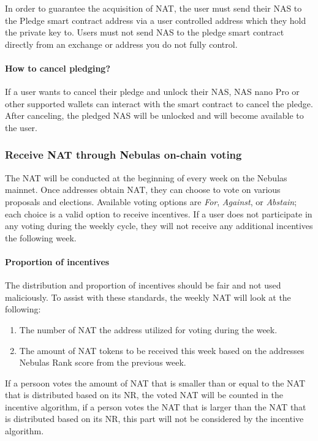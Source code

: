 In order to guarantee the acquisition of NAT, the user must send their NAS to the Pledge smart contract address via a user controlled address which they hold the private key to. Users must not send NAS to the pledge smart contract directly from an exchange or address you do not fully control.


\paragraph{How to cancel pledging?}

If a user wants to cancel their pledge and unlock their NAS, NAS nano Pro or other supported wallets can interact with the smart contract to cancel the pledge. After canceling, the pledged NAS will be unlocked and will become available to the user.

\subsubsection{Receive NAT through Nebulas on-chain voting}

The NAT will be conducted at the beginning of every week on the Nebulas
mainnet. Once addresses obtain NAT, they can choose to vote on various
proposals and elections. Available voting options are \textit{For}, \textit{Against}, or
\textit{Abstain}; each choice is a valid option to receive incentives. If a user does not participate in any voting during the weekly cycle, they will not receive any additional incentives the following week.


\paragraph{Proportion of incentives}

The distribution and proportion of incentives should be fair and not used maliciously. To assist with these standards, the weekly NAT will look at the following:

\begin{enumerate}
	\item The number of NAT the address utilized for voting during the week.
	\item The amount of NAT tokens to be received this week based on the addresses Nebulas Rank score from the previous week.
\end{enumerate}

If a persoon votes the amount of NAT that is smaller than or equal to the NAT that is distributed based on its NR, the voted NAT will be counted in the incentive algorithm, if a person votes the NAT that is larger than the NAT that is distributed based on its NR, this part will not be considered by the incentive algorithm. 

